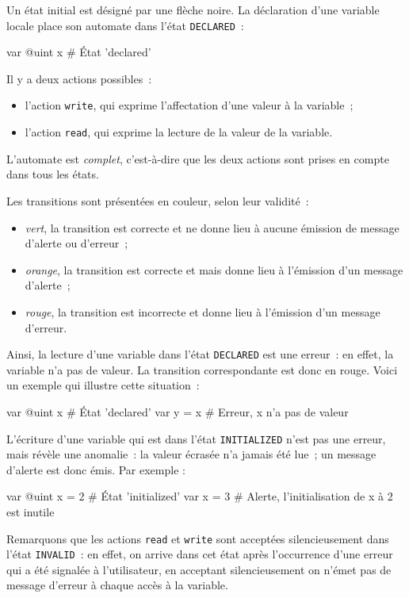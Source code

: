 Un état initial est désigné par une flèche noire. La déclaration d'une variable locale place son automate dans l'état \texttt{DECLARED}~:

\begin{galgas}
var @uint x # État 'declared'
\end{galgas}

Il y a deux actions possibles~:
\begin{itemize}
  \item l'action \texttt{write}, qui exprime l'affectation d'une valeur à la variable~;
  \item l'action \texttt{read}, qui exprime la lecture de la valeur de la variable.
\end{itemize}

L'automate est \emph{complet}, c'est-à-dire que les deux actions sont prises en compte dans tous les états.

Les transitions sont présentées en couleur, selon leur validité~:
\begin{itemize}
  \item \emph{vert}, la transition est correcte et ne donne lieu à aucune émission de message d'alerte ou d'erreur~;
  \item \emph{orange}, la transition est correcte et mais donne lieu à l'émission d'un message d'alerte~;
  \item \emph{rouge}, la transition est incorrecte et donne lieu à l'émission d'un message d'erreur.
\end{itemize}

Ainsi, la lecture d'une variable dans l'état \texttt{DECLARED} est une erreur~: en effet, la variable n'a pas de valeur. La transition correspondante est donc en rouge. Voici un exemple qui illustre cette situation~:
\begin{galgas}
var @uint x # État 'declared'
var y = x # Erreur, x n'a pas de valeur
\end{galgas}

L'écriture d'une variable qui est dans l'état \texttt{INITIALIZED} n'est pas une erreur, mais révèle une anomalie~: la valeur écrasée n'a jamais été lue~; un message d'alerte est donc émis. Par exemple :
\begin{galgas}
var @uint x = 2 # État 'initialized'
var x = 3 # Alerte, l'initialisation de x à 2 est inutile
\end{galgas}

Remarquons que les actions \texttt{read} et \texttt{write} sont acceptées silencieusement dans l'état \texttt{INVALID}~: en effet, on arrive dans cet état après l'occurrence d'une erreur qui a été signalée à l'utilisateur, en acceptant silencieusement on n'émet pas de message d'erreur à chaque accès à la variable.

